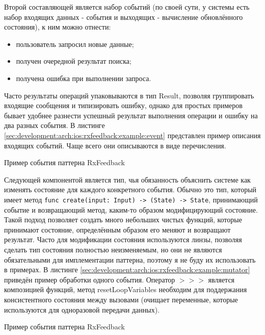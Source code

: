Второй составляющей является набор событий (по своей сути, у системы есть набор входящих данных - события и выходящих - вычисление обновлённого состояния), к ним можно отнести:

\begin{itemize}
  \item пользователь запросил новые данные;
  \item получен очередной результат поиска;
  \item получена ошибка при выполнении запроса.
\end{itemize}

Часто результаты операций упаковываются в тип Result, позволяя группировать входящие сообщения и типизировать ошибку, однако для простых примеров бывает удобнее разнести успешный результат выполнения операции и ошибку на два разных события. В листинге \ref{sec:development:arch:ios:rxfeedback:example:event} представлен пример описания входящих событий. Чаще всего они описываются в виде перечисления.

\begin{code}
  
   \caption{Пример события паттерна RxFeedback}
   \label{sec:development:arch:ios:rxfeedback:example:event}
\end{code}

Следующей компонентой является тип, чья обязанность объяснить системе как изменять состояние для каждого конкретного события. Обычно это тип, который имеет метод \texttt{func create(input: Input) -> (State) -> State}, принимающий событие и возвращающий метод, каким-то образом модифицирующий состояние. Такой подход позволяет создать много небольших чистых функций, которые принимают состояние, определённым образом его меняют и возвращают результат. Часто для модификации состояния используются линзы, позволяя сделать тип состояния полностью неизменяемым, но они не являются обязательными для имплементации паттерна, поэтому я не буду их использовать в примерах. В листинге \ref{sec:development:arch:ios:rxfeedback:example:mutator} приведён пример обработки одного события. Оператор \(>>>\) является композицией функций, метод resetLoopVariables необходим для поддержания консистентного состояния между вызовами (очищает переменные, которые используются для одноразовой передачи данных).

\begin{code}
  
   \caption{Пример события паттерна RxFeedback}
   \label{sec:development:arch:ios:rxfeedback:example:mutator}
\end{code}

